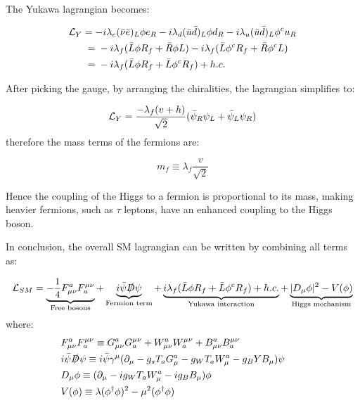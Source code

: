 The Yukawa lagrangian becomes:

\begin{align}
    \MoveEqLeft[3]
    \Lagr_Y = -i\lambda_e (\Bar{\nu}\Bar{e})_L \phi e_R - i\lambda_d (\Bar{u}\Bar{d})_L \phi d_R - i\lambda_u (\Bar{u}\Bar{d})_L \phi^c u_R \\ ={}& -i\lambda_f (\Bar{L}\phi R_f + \Bar{R}\phi L) - i\lambda_f(\Bar{L}\phi^c R_f + \Bar{R}\phi^c L) \\ ={}& -i\lambda_f(\Bar{L}\phi R_f + \Bar{L}\phi^cR_f) + h.c.
\end{align}

After picking the gauge, by arranging the chiralities, the lagrangian simplifies to:

\begin{equation}
    \mathcal{L}_Y = \frac{-\lambda_f (v+h)}{\sqrt{2}}(\Bar{\psi}_R\psi_L + \Bar{\psi}_L\psi_R)
\end{equation}
therefore the mass terms of the fermions are:

\begin{equation}
    m_f \equiv \lambda_f \frac{v}{\sqrt{2}}
\end{equation}

Hence the coupling of the Higgs to a fermion is proportional to its mass, making heavier fermions, such as $\tau$ leptons, have an enhanced coupling to the Higgs boson.

In conclusion, the overall SM lagrangian can be written by combining all terms as:

\begin{equation}
    \mathcal{L}_{SM} = \underbrace{- \frac{1}{4} F_{\mu\nu}^a F^{\mu\nu}_a}_{\text{Free bosons}} + \underbrace{i\Bar{\psi}\slashed{D}\psi}_{\text{Fermion term}} +\underbrace{i\lambda_f(\Bar{L}\phi R_f + \Bar{L}\phi^cR_f) + h.c.}_{\text{Yukawa interaction}} + \underbrace{|D_{\mu}\phi|^2 - V(\phi)}_{\text{Higgs mechanism}}
\end{equation}
where:
\begin{align*}
    & F_{\mu\nu}^a F^{\mu\nu}_a \equiv G_{\mu\nu}^a G^{\mu\nu}_a + W_{\mu\nu}^a W^{\mu\nu}_a + B_{\mu\nu}^a B^{\mu\nu}_a \\
    & i\Bar{\psi}\slashed{D}\psi \equiv i\Bar{\psi}\gamma^{\mu} (\partial_{\mu} - g_s T_a G_{\mu}^a - g_W T_a W^{a}_{\mu} - g_B Y B_{\mu})  \psi \\
    & D_{\mu}\phi \equiv (\partial_{\mu} - ig_W T_a W_{\mu}^{a} - ig_B B_{\mu})\phi \\
    & V(\phi) \equiv \lambda(\phi^{\dagger}\phi)^2 - \mu^2 (\phi^{\dagger}\phi) &&
\end{align*}

